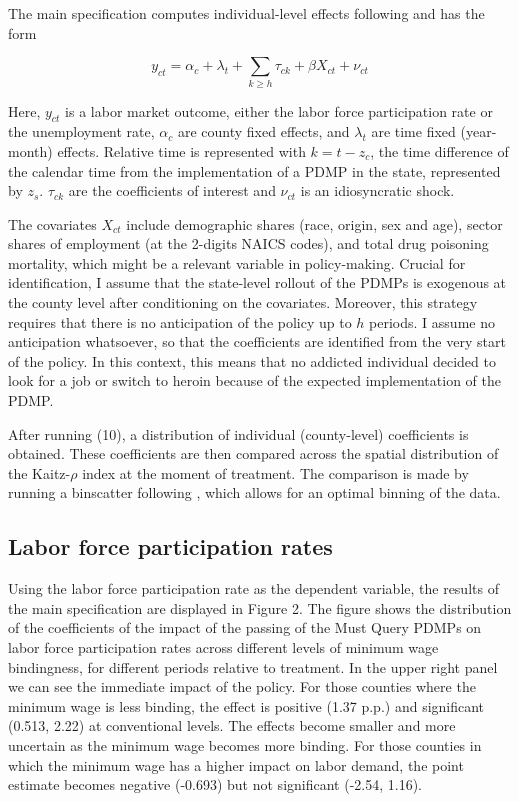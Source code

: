 \documentclass[12pt,a4paper]{article}
\begin{document}
The main specification computes individual-level effects following \textcite{Arkhangelsky2024} and has the form

\begin{equation}
    y_{ct} = \alpha_c + \lambda_t + \sum_{k\geq h}\tau_{ck} + \beta X_{ct} + \nu_{ct}
\end{equation}

Here, \(y_{ct}\) is a labor market outcome, either the labor force participation rate or the unemployment rate, \(\alpha_c\) are county fixed effects, and \(\lambda_t\) are time fixed (year-month) effects.
Relative time is represented with \(k = t - z_c\), the time difference of the calendar time from the implementation of a PDMP in the state, represented by \(z_s\).
\(\tau_{ck}\) are the coefficients of interest and \(\nu_{ct}\) is an idiosyncratic shock.

The covariates \(X_{ct}\) include demographic shares (race, origin, sex and age), sector shares of employment (at the 2-digits NAICS codes), and total drug poisoning mortality, which might be a relevant variable in policy-making.
Crucial for identification, I assume that the state-level rollout of the PDMPs is exogenous at the county level after conditioning on the covariates.
Moreover, this strategy requires that there is no anticipation of the policy up to \(h\) periods. 
I assume no anticipation whatsoever, so that the coefficients are identified from the very start of the policy.
In this context, this means that no addicted individual decided to look for a job or switch to heroin because of the expected implementation of the PDMP. 

After running (10), a distribution of individual (county-level) coefficients is obtained.
These coefficients are then compared across the spatial distribution of the Kaitz-\(\rho\) index at the moment of treatment.
The comparison is made by running a binscatter following \textcite{Cattaneo2024}, which allows for an optimal binning of the data.

\subsection*{Labor force participation rates}

Using the labor force participation rate as the dependent variable, the results of the main specification are displayed in Figure 2.
The figure shows the distribution of the coefficients of the impact of the passing of the Must Query PDMPs on labor force participation rates across different levels of minimum wage bindingness, for different periods relative to treatment.
In the upper right panel we can see the immediate impact of the policy.
For those counties where the minimum wage is less binding, the effect is positive (1.37 p.p.) and significant (0.513, 2.22) at conventional levels.
The effects become smaller and more uncertain as the minimum wage becomes more binding.
For those counties in which the minimum wage has a higher impact on labor demand, the point estimate becomes negative (-0.693) but not significant (-2.54, 1.16).
\end{document}
